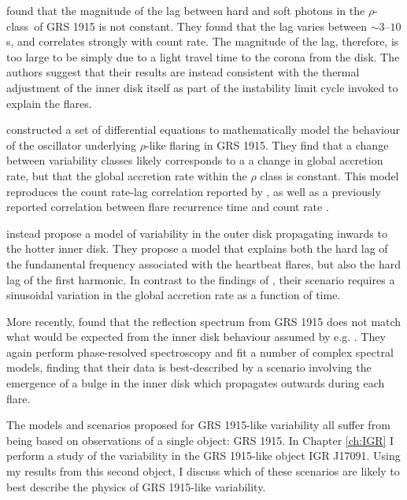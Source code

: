 \par \citealp{Massa_MoveLag} found that the magnitude of the lag between hard and soft photons in the $\rho$-class\indexrho\ of GRS 1915 is not constant.  They found that the lag varies between $\sim3$--$10$\,s, and correlates strongly with count rate.  The magnitude of the lag, therefore, is too large to be simply due to a light travel time to the corona from the disk.  The authors suggest that their results are instead consistent with the thermal adjustment of the inner disk itself as part of the instability limit cycle invoked to explain the flares.
\par \citealp{Massaro_Numerical} constructed a set of differential equations to mathematically model the behaviour of the oscillator underlying $\rho$-like flaring in GRS 1915.  They find that a change between variability classes likely corresponds to a a change in global accretion rate, but that the global accretion rate within the $\rho$ class is constant.  This model reproduces the count rate-lag correlation reported by \citealp{Massa_MoveLag}, as well as a previously reported correlation between flare recurrence time and count rate \citep{Massaro_Lag}.
\par \citealp{Mir_LagModel} instead propose a model of variability in the outer disk propagating inwards to the hotter inner disk.  They propose a model that explains both the hard lag of the fundamental frequency associated with the heartbeat flares, but also the hard lag of the first harmonic.  In contrast to the findings of \citealp{Massaro_Numerical}, their scenario requires a sinusoidal variation in the global accretion rate as a function of time.
\par More recently, \citealp{Zoghbi_Bulge} found that the reflection spectrum from GRS 1915 does not match what would be expected from the inner disk behaviour assumed by e.g. \citealp{Nayakshin_GRSModel}.  They again perform phase-resolved spectroscopy and fit a number of complex spectral models, finding that their data is best-described by a scenario involving the emergence of a bulge in the inner disk which propagates outwards during each flare.
\par The models and scenarios proposed for GRS 1915-like variability all suffer from being based on observations of a single object: GRS 1915.  In Chapter \ref{ch:IGR} I perform a study of the variability in the GRS 1915-like object IGR J17091.  Using my results from this second object, I discuss which of these scenarios are likely to best describe the physics of GRS 1915-like variability.

